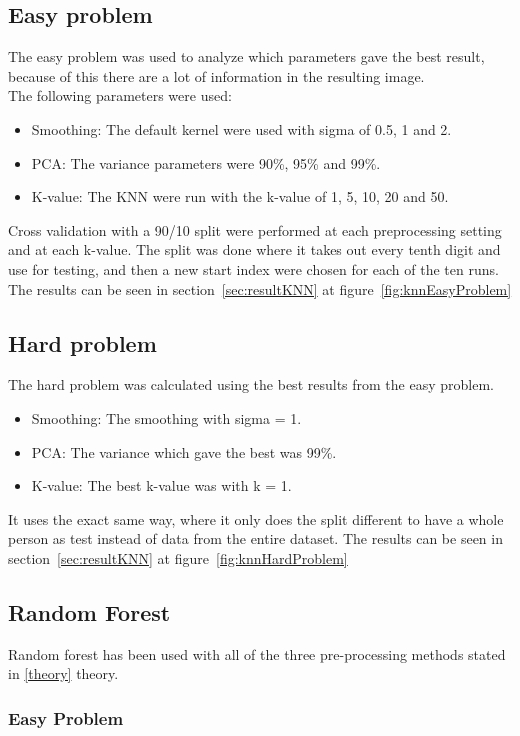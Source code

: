 \documentclass[report]{subfiles}
\begin{document}
\subsection{Easy problem}
The easy problem was used to analyze which parameters gave the best result, because of this there are a lot of information in the resulting image.\\
The following parameters were used:
\begin{itemize}
  \item Smoothing: The default kernel were used with sigma of 0.5, 1 and 2.
  \item PCA: The variance parameters were 90\%, 95\% and 99\%.
  \item K-value: The KNN were run with the k-value of 1, 5, 10, 20 and 50.
\end{itemize}
Cross validation with a 90/10 split were performed at each preprocessing setting and at each k-value. The split was done where it takes out every tenth digit and use for testing, and then a new start index were chosen for each of the ten runs.
The results can be seen in section~\ref{sec:resultKNN}  at figure~\ref{fig:knnEasyProblem}

\subsection{Hard problem}
The hard problem was calculated using the best results from the easy problem.
\begin{itemize}
  \item Smoothing: The smoothing with sigma = 1.
  \item PCA: The variance which gave the best was 99\%.
  \item K-value: The best k-value was with k = 1.
\end{itemize}
It uses the exact same way, where it only does the split different to have a whole person as test instead of data from the entire dataset.
The results can be seen in section~\ref{sec:resultKNN}  at figure~\ref{fig:knnHardProblem}

\subsection{Random Forest}
\label{sec:impRandomForest}
Random forest has been used with all of the three pre-processing methods stated in \ref{theory} \refname{theory}.

\subsubsection{Easy Problem}
\end{document}
